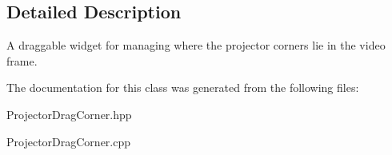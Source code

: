 \subsection{Detailed Description}
A draggable widget for managing where the projector corners lie in the video frame. 

The documentation for this class was generated from the following files\+:\begin{DoxyCompactItemize}
\item 
Projector\+Drag\+Corner.\+hpp\item 
Projector\+Drag\+Corner.\+cpp\end{DoxyCompactItemize}
